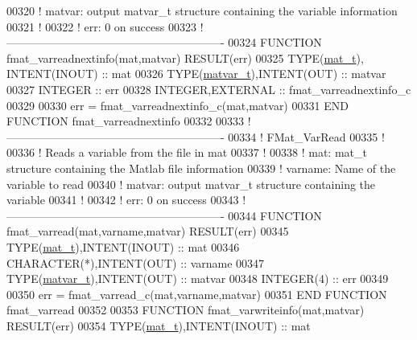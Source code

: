 \begin{DoxyCode}
00320 \textcolor{comment}{!   matvar:  output matvar\_t structure containing the variable information}
00321 \textcolor{comment}{!}
00322 \textcolor{comment}{!   err: 0 on success}
00323 \textcolor{comment}{!----------------------------------------------------------}
00324 \textcolor{keyword}{    FUNCTION }fmat\_varreadnextinfo(mat,matvar) \textcolor{keyword}{RESULT}(err)
00325         \textcolor{keywordtype}{TYPE}(\hyperlink{group___m_a_t_gab0fc888f5a5d79943b16284b1f91c2e8}{mat\_t}),   \textcolor{keywordtype}{INTENT(INOUT)}         :: mat
00326         \textcolor{keywordtype}{TYPE}(\hyperlink{group___m_a_t_structmatvar__t}{matvar\_t}),\textcolor{keywordtype}{INTENT(OUT)}           :: matvar
00327         \textcolor{keywordtype}{INTEGER}                              :: err
00328         \textcolor{keywordtype}{INTEGER},\textcolor{keywordtype}{EXTERNAL}                     :: fmat\_varreadnextinfo\_c
00329 
00330         err = fmat\_varreadnextinfo\_c(mat,matvar)
00331 \textcolor{keyword}{    END FUNCTION }fmat\_varreadnextinfo
00332 
00333 \textcolor{comment}{!----------------------------------------------------------}
00334 \textcolor{comment}{!   FMat\_VarRead}
00335 \textcolor{comment}{!}
00336 \textcolor{comment}{!   Reads a variable from the file in mat}
00337 \textcolor{comment}{!}
00338 \textcolor{comment}{!   mat:     mat\_t structure containing the Matlab file information}
00339 \textcolor{comment}{!   varname: Name of the variable to read}
00340 \textcolor{comment}{!   matvar:  output matvar\_t structure containing the variable}
00341 \textcolor{comment}{!}
00342 \textcolor{comment}{!   err: 0 on success}
00343 \textcolor{comment}{!----------------------------------------------------------}
00344 \textcolor{keyword}{    FUNCTION }fmat\_varread(mat,varname,matvar) \textcolor{keyword}{RESULT}(err)
00345         \textcolor{keywordtype}{TYPE}(\hyperlink{group___m_a_t_gab0fc888f5a5d79943b16284b1f91c2e8}{mat\_t}),\textcolor{keywordtype}{INTENT(INOUT)}          :: mat
00346         \textcolor{keywordtype}{CHARACTER(*)},\textcolor{keywordtype}{INTENT(OUT)}           :: varname
00347         \textcolor{keywordtype}{TYPE}(\hyperlink{group___m_a_t_structmatvar__t}{matvar\_t}),\textcolor{keywordtype}{INTENT(OUT)}         :: matvar
00348         \textcolor{keywordtype}{INTEGER(4)}                         :: err
00349 
00350         err = fmat\_varread\_c(mat,varname,matvar)
00351 \textcolor{keyword}{    END FUNCTION }fmat\_varread
00352 
00353 \textcolor{keyword}{    FUNCTION }fmat\_varwriteinfo(mat,matvar) \textcolor{keyword}{RESULT}(err)
00354         \textcolor{keywordtype}{TYPE}(\hyperlink{group___m_a_t_gab0fc888f5a5d79943b16284b1f91c2e8}{mat\_t}),\textcolor{keywordtype}{INTENT(INOUT)}           :: mat

\end{DoxyCode}
